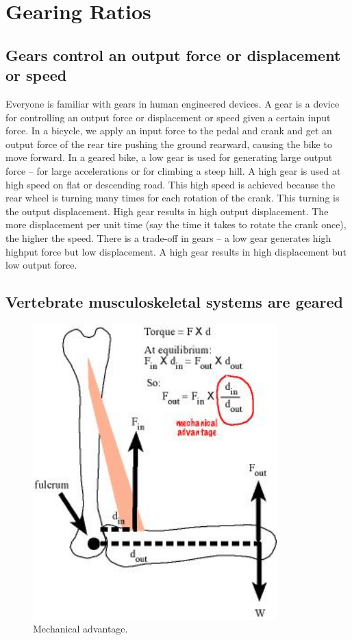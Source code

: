 \documentclass[]{book}
\begin{document}
\chapter{Gearing Ratios}\label{gearing-ratios}

\section{Gears control an output force or displacement or
speed}\label{gears-control-an-output-force-or-displacement-or-speed}

Everyone is familiar with gears in human engineered devices. A gear is a
device for controlling an output force or displacement or speed given a
certain input force. In a bicycle, we apply an input force to the pedal
and crank and get an output force of the rear tire pushing the ground
rearward, causing the bike to move forward. In a geared bike, a low gear
is used for generating large output force -- for large accelerations or
for climbing a steep hill. A high gear is used at high speed on flat or
descending road. This high speed is achieved because the rear wheel is
turning many times for each rotation of the crank. This turning is the
output displacement. High gear results in high output displacement. The
more displacement per unit time (say the time it takes to rotate the
crank once), the higher the speed. There is a trade-off in gears -- a
low gear generates high highput force but low displacement. A high gear
results in high displacement but low output force.

\section{Vertebrate musculoskeletal systems are
geared}\label{vertebrate-musculoskeletal-systems-are-geared}

\begin{figure}
\includegraphics[width=3.71in]{images/gear_chapter/mechanical_advantage} \caption{Mechanical advantage.}\label{fig:gearing1}
\end{figure}
\end{document}
